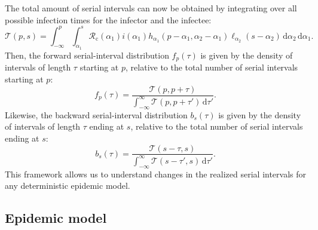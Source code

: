 \documentclass[12pt]{article}
\newcommand{\Rx}[1]{\ensuremath{{\mathcal R}_{#1}}\xspace}
\newcommand{\Rc}{\Rx{\mathrm{c}}}
\newcommand{\dd}[1]{\ensuremath{\, \mathrm{d}#1}}
\newcommand{\dtau}{\dd{\tau}}
\newcommand{\psymp}{\ensuremath{p}} %
\newcommand{\ssymp}{\ensuremath{s}} %
\newcommand{\pinf}{\ensuremath{\alpha_1}} %
\newcommand{\sinf}{\ensuremath{\alpha_2}} %
\newcommand{\idist}{\ell} %
\newcommand{\total}{{\mathcal T}} %
\begin{document}
The total amount of serial intervals can now be obtained by integrating over all possible infection times for the infector and the infectee:
\begin{equation}
\total (\psymp,\ssymp) = \int_{-\infty}^{\psymp} \int_{\pinf}^{\ssymp} \Rc (\pinf) i(\pinf) h_{\pinf}(\psymp-\pinf, \sinf - \pinf) \idist_{\sinf}(\ssymp - \sinf) \, \mathrm{d}\sinf\,\mathrm{d}\pinf.
\end{equation}
Then, the forward serial-interval distribution $f_\psymp(\tau)$ is given by the density of intervals of length $\tau$ starting at \psymp, relative to the total number of serial intervals starting at \psymp: 
\begin{equation}
f_\psymp(\tau) = 
\frac{\total(\psymp, \psymp+\tau)}{\int_{-\infty}^\infty \total(\psymp, \psymp+\tau') \dtau'}.
\label{eq:fserial}
\end{equation}
Likewise, the backward serial-interval distribution $b_\ssymp(\tau)$ is given by the density of intervals of length $\tau$ ending at \ssymp, relative to the total number of serial intervals ending at \ssymp: 
\begin{equation}
b_\ssymp(\tau) = 
\frac{\total(\ssymp-\tau, \ssymp)}{\int_{-\infty}^\infty \total(\ssymp-\tau', \ssymp) \dtau'}.
\label{eq:bserial}
\end{equation}
This framework allows us to understand changes in the realized serial intervals for any deterministic epidemic model.

\subsection{Epidemic model}
\end{document}
